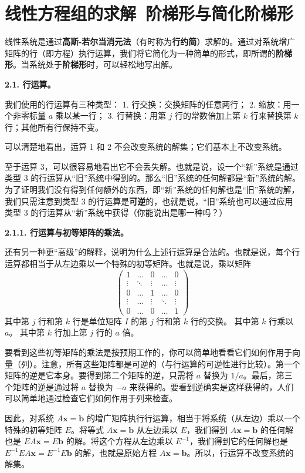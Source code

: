 \section{线性方程组的求解~阶梯形与简化阶梯形}

线性系统是通过\textbf{高斯-若尔当消元法}（有时称为\textbf{行约简}）求解的。通过对系统增广矩阵的行（即方程）执行运算，我们将它简化为一种简单的形式，即所谓的\textbf{阶梯形}。当系统处于\textbf{阶梯形}时，可以轻松地写出解。

\textbf{2.1. 行运算。}

我们使用的行运算有三种类型：
1. 行交换：交换矩阵的任意两行；
2. 缩放：用一个非零标量 $a$ 乘以某一行；
3. 行替换：用第 $j$ 行的常数倍加上第 $k$ 行来替换第 $k$ 行；其他所有行保持不变。

可以清楚地看出，运算 1 和 2 不会改变系统的解集；它们基本上不改变系统。

至于运算 3，可以很容易地看出它不会丢失解。也就是说，设一个“新”系统是通过类型 3 的行运算从“旧”系统中得到的。那么“旧”系统的任何解都是“新”系统的解。为了证明我们没有得到任何额外的东西，即“新”系统的任何解也是“旧”系统的解，我们只需注意到类型 3 的行运算是\textbf{可逆}的，也就是说，“旧”系统也可以通过应用类型 3 的行运算从“新”系统中获得（你能说出是哪一种吗？）

\textbf{2.1.1. 行运算与初等矩阵的乘法。}

还有另一种更“高级”的解释，说明为什么上述行运算是合法的。也就是说，每个行运算都相当于从左边乘以一个特殊的初等矩阵。也就是说，乘以矩阵
$$
\begin{pmatrix}
1 & \dots & 0 & \dots & 0 \\
\vdots & \ddots & \vdots & \dots & \vdots \\
0 & \dots & 1 & \dots & 0 \\
\vdots & \dots & \vdots & \ddots & \vdots \\
0 & \dots & 0 & \dots & 1
\end{pmatrix}
$$
其中第 $j$ 行和第 $k$ 行是单位矩阵 $I$ 的第 $j$ 行和第 $k$ 行的交换。
其中第 $k$ 行乘以 $a$。
其中第 $k$ 行加上第 $j$ 行的 $a$ 倍。

要看到这些初等矩阵的乘法是按预期工作的，你可以简单地看看它们如何作用于向量（列）。注意，所有这些矩阵都是可逆的（与行运算的可逆性进行比较）。第一个矩阵的逆是它本身。要得到第二个矩阵的逆，只需将 $a$ 替换为 $1/a$。最后，第三个矩阵的逆是通过将 $a$ 替换为 $-a$ 来获得的。要看到逆确实是这样获得的，人们可以简单地通过检查它们如何作用于列来检查。

因此，对系统 $A \mathbf{x} = \mathbf{b}$ 的增广矩阵执行行运算，相当于将系统（从左边）乘以一个特殊的初等矩阵 $E$。将等式 $A \mathbf{x} = \mathbf{b}$ 从左边乘以 $E$，我们得到 $A \mathbf{x} = \mathbf{b}$ 的任何解也是 $EA \mathbf{x} = E \mathbf{b}$ 的解。将这个方程从左边乘以 $E^{-1}$，我们得到它的任何解也是 $E^{-1} EA \mathbf{x} = E^{-1} E \mathbf{b}$ 的解，也就是原始方程 $A \mathbf{x} = \mathbf{b}$。所以，行运算不改变系统的解集。

